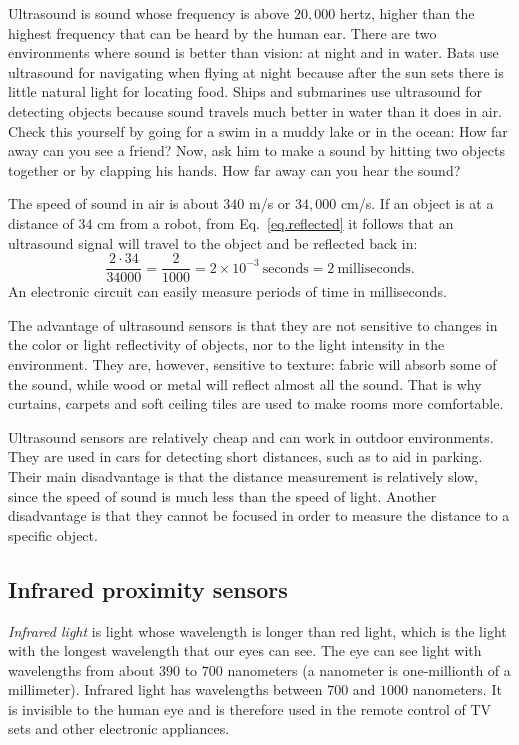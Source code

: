 Ultrasound is sound whose frequency is above $20,000$ hertz, higher than the highest frequency that can be heard by the human ear. There are two environments where sound is better than vision: at night and in water. Bats use ultrasound for navigating when flying at night because after the sun sets there is little natural light for locating food. Ships and submarines use ultrasound for detecting objects because sound travels much better in water than it does in air. Check this yourself by going for a swim in a muddy lake or in the ocean: How far away can you see a friend? Now, ask him to make a sound by hitting two objects together or by clapping his hands. How far away can you hear the sound? 

The speed of sound in air is about $340$ m/s or $34,000$ cm/s. If an object is at a distance of $34$ cm from a robot, from Eq.~\ref{eq.reflected} it follows that an ultrasound signal will travel to the object and be reflected back in:
\[\frac{2\cdot 34}{34000} = \frac{2}{1000} = 2\times 10^{-3}\  \textrm{seconds} = 2\  \textrm{milliseconds}.\]
An electronic circuit can easily measure periods of time in milliseconds.

The advantage of ultrasound sensors is that they are not sensitive to changes in the color or light reflectivity of objects, nor to the light intensity in the environment. They are, however, sensitive to texture: fabric will absorb some of the sound, while wood or metal will reflect almost all the sound. That is why curtains, carpets and soft ceiling tiles are used to make rooms more comfortable.

Ultrasound sensors are relatively cheap and can work in outdoor environments. They are used in cars for detecting short distances, such as to aid in parking. Their main disadvantage is that the distance measurement is relatively slow, since the speed of sound is much less than the speed of light. Another disadvantage is that they cannot be focused in order to measure the distance to a specific object.

\subsection{Infrared proximity sensors}

\emph{Infrared light} is light whose wavelength is longer than red light, which is the light with the longest wavelength that our eyes can see. The eye can see light with wavelengths from about $390$ to $700$ nanometers (a nanometer is one-millionth of a millimeter). Infrared light has wavelengths between $700$ and $1000$ nanometers. It is invisible to the human eye and is therefore used in the remote control of TV sets and other electronic appliances.

